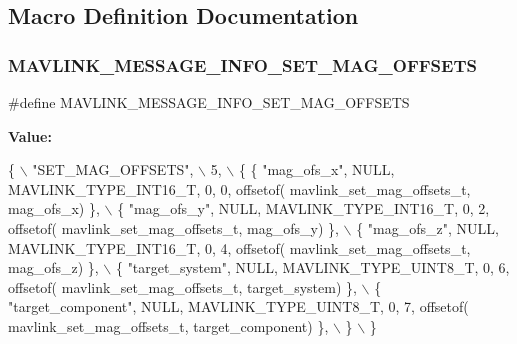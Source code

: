 \subsection{Macro Definition Documentation}
\mbox{\label{mavlink__msg__set__mag__offsets_8h_a2f8d12714e922c60c2870995def75336}} 
\subsubsection{M\+A\+V\+L\+I\+N\+K\+\_\+\+M\+E\+S\+S\+A\+G\+E\+\_\+\+I\+N\+F\+O\+\_\+\+S\+E\+T\+\_\+\+M\+A\+G\+\_\+\+O\+F\+F\+S\+E\+TS}
{\footnotesize\ttfamily \#define M\+A\+V\+L\+I\+N\+K\+\_\+\+M\+E\+S\+S\+A\+G\+E\+\_\+\+I\+N\+F\+O\+\_\+\+S\+E\+T\+\_\+\+M\+A\+G\+\_\+\+O\+F\+F\+S\+E\+TS}

{\bfseries Value\+:}
\begin{DoxyCode}
\{ \(\backslash\)
    \textcolor{stringliteral}{"SET\_MAG\_OFFSETS"}, \(\backslash\)
    5, \(\backslash\)
    \{  \{ \textcolor{stringliteral}{"mag\_ofs\_x"}, NULL, MAVLINK_TYPE_INT16_T, 0, 0, offsetof(
      mavlink_set_mag_offsets_t, mag\_ofs\_x) \}, \(\backslash\)
         \{ \textcolor{stringliteral}{"mag\_ofs\_y"}, NULL, MAVLINK_TYPE_INT16_T, 0, 2, offsetof(
      mavlink_set_mag_offsets_t, mag\_ofs\_y) \}, \(\backslash\)
         \{ \textcolor{stringliteral}{"mag\_ofs\_z"}, NULL, MAVLINK_TYPE_INT16_T, 0, 4, offsetof(
      mavlink_set_mag_offsets_t, mag\_ofs\_z) \}, \(\backslash\)
         \{ \textcolor{stringliteral}{"target\_system"}, NULL, MAVLINK_TYPE_UINT8_T, 0, 6, offsetof(
      mavlink_set_mag_offsets_t, target\_system) \}, \(\backslash\)
         \{ \textcolor{stringliteral}{"target\_component"}, NULL, MAVLINK_TYPE_UINT8_T, 0, 7, offsetof(
      mavlink_set_mag_offsets_t, target\_component) \}, \(\backslash\)
         \} \(\backslash\)
\}
\end{DoxyCode}
\mbox{\label{mavlink__msg__set__mag__offsets_8h_a03e87013d90d3d0e04acdb1539be4985}} 

